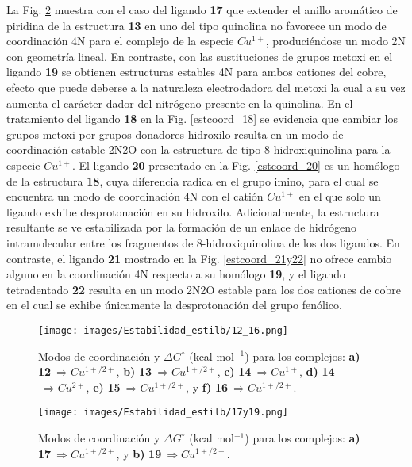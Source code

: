 La Fig. \ref{estcoord_17y19} muestra con el caso del ligando \textbf{17} que extender el anillo aromático de piridina de la estructura \textbf{13} en uno del tipo quinolina no favorece un modo de coordinación 4N para el complejo de la especie $Cu^{1+}$, produciéndose un modo 2N con geometría lineal. En contraste, con las sustituciones de grupos metoxi en el ligando \textbf{19} se obtienen estructuras estables 4N para ambos cationes del cobre, efecto que puede deberse a la naturaleza electrodadora del metoxi la cual a su vez aumenta el carácter dador del nitrógeno presente en la quinolina. En el tratamiento del ligando \textbf{18} en la Fig. \ref{estcoord_18} se evidencia que cambiar los grupos metoxi por grupos donadores hidroxilo resulta en un modo de coordinación estable 2N2O con la estructura de tipo 8-hidroxiquinolina para la especie $Cu^{1+}$. El ligando \textbf{20} presentado en la Fig. \ref{estcoord_20} es un homólogo de la estructura \textbf{18}, cuya diferencia radica en el grupo imino, para el cual se encuentra un modo de coordinación 4N con el catión $Cu^{1+}$ en el que solo un ligando exhibe desprotonación en su hidroxilo. Adicionalmente, la estructura resultante se ve estabilizada por la formación de un enlace de hidrógeno intramolecular entre los fragmentos de 8-hidroxiquinolina de los dos ligandos. En contraste, el ligando \textbf{21} mostrado en la Fig. \ref{estcoord_21y22} no ofrece cambio alguno en la coordinación 4N respecto a su homólogo \textbf{19}, y el ligando tetradentado \textbf{22} resulta en un modo 2N2O estable para los dos cationes de cobre en el cual se exhibe únicamente la desprotonación del grupo fenólico.

\clearpage

\begin{figure}[ht] 
\centering
\centerline{\texttt{[image: images/Estabilidad\_estilb/12\_16.png]}}
\caption{Modos de coordinación y $\Delta G^{\circ}$ (kcal mol$^{-1}$) para los complejos: \textbf{a)} \textbf{12}$\ \Rightarrow Cu^{1+/2+}$, \textbf{b)} \textbf{13}$\ \Rightarrow Cu^{1+/2+}$, \textbf{c)} \textbf{14}$\ \Rightarrow Cu^{1+}$, \textbf{d)} \textbf{14}$\ \Rightarrow Cu^{2+}$, \textbf{e)} \textbf{15}$\ \Rightarrow Cu^{1+/2+}$, y \textbf{f)} \textbf{16}$\ \Rightarrow Cu^{1+/2+}$.}
\label{estcoord_12_16}
\end{figure}

\begin{figure}[ht] 
\centering
\texttt{[image: images/Estabilidad\_estilb/17y19.png]}
\caption{Modos de coordinación y $\Delta G^{\circ}$ (kcal mol$^{-1}$) para los complejos: \textbf{a)} \textbf{17}$\ \Rightarrow Cu^{1+/2+}$, y \textbf{b)} \textbf{19}$\ \Rightarrow Cu^{1+/2+}$.}
\label{estcoord_17y19}
\end{figure}

